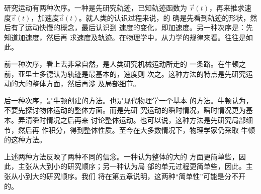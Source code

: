 研究运动有两种次序。一种是先研究轨迹，已知轨迹函数为
$\vec{r}\left(t\right)$，再来推求速度$\vec{v}\left(t\right)$，加速度$\vec{a}\left(t\right)$。就人类的认识过程来说，的
确是先看到轨迹的形状，然后有了运动快慢的概念，最后认识到
速度的变化，即加速度。另一种次序是：先知道加速度，然后再
求速度及轨迹。在物理学中，从力学的规律来看。往往是如此。

前一种次序，看上去非常自然，是人类研究机械运动所走的
一条路。在牛顿之前，亚里士多德认为轨迹是最基本的，速度则
次之。这种方法的特点是先研究运动的大的整体方面，然后再涉
及局部细节。

后一种次序，是牛顿创建的方法。也是现代物理学一个基本
的方法。牛顿认为，不要先探讨物体运动的整体方面。而是先研
究运动的瞬时情况，瞬时情况更为基本。弄清瞬时情况之后再来
讨论整体运动。也可以说，这种方法是先研究局部细节，然后再
作积分，得到整体性质。至今在大多数情况下，物理学家仍采取
牛顿的这种方法。

上述两种方法反映了两种不同的信念。一种认为整体的大的
方面更简单些，因此，主张从大到小的研究顺序；另一种认为局
部的单元过程更简单些，因此。主张从小到大的研究顺序。我们
将在第五章说明，这两种“简单性”可能是分不开的。